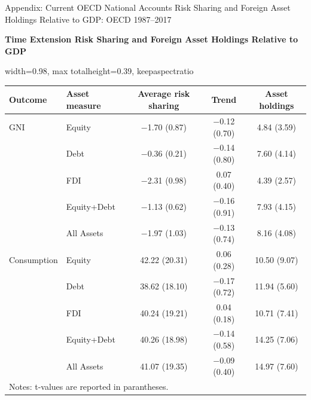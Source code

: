 \documentclass[aspectratio=169, 10pt]{beamer}
\begin{document}
\begin{frame}[label=appendix:oecd2005_assets]{Appendix: Current OECD National Accounts Risk Sharing and Foreign Asset Holdings Relative to GDP: OECD 1987--2017}
  \centering
  
  \begingroup
  \tiny
  \setlength{\tabcolsep}{2pt}
  \renewcommand{\arraystretch}{0.62}
  
  \vspace{0.03cm}
  
  {\scriptsize \textbf{Time Extension Risk Sharing and Foreign Asset Holdings Relative to GDP}}
  
  \vspace{0.04cm}
  
  \begin{adjustbox}{
    width=0.98\textwidth,
    max totalheight=0.39\textheight,
    keepaspectratio
  }
  \begin{tabular}{llccc}
  \hline\hline
  Outcome & Asset measure & Average risk sharing & Trend & Asset holdings \\
  \hline
  GNI         & Equity       & $-$1.70 (0.87) & $-$0.12 (0.70) & 4.84 (3.59)  \\
  & Debt         & $-$0.36 (0.21) & $-$0.14 (0.80) & 7.60 (4.14)  \\
  & FDI          & $-$2.31 (0.98) & 0.07 (0.40)    & 4.39 (2.57)  \\
  & Equity+Debt  & $-$1.13 (0.62) & $-$0.16 (0.91) & 7.93 (4.15)  \\
  & All Assets   & $-$1.97 (1.03) & $-$0.13 (0.74) & 8.16 (4.08)  \\
  \hline
  Consumption & Equity       & 42.22 (20.31)  & 0.06 (0.28)    & 10.50 (9.07) \\
  & Debt         & 38.62 (18.10)  & $-$0.17 (0.72) & 11.94 (5.60) \\
  & FDI          & 40.24 (19.21)  & 0.04 (0.18)    & 10.71 (7.41) \\
  & Equity+Debt  & 40.26 (18.98)  & $-$0.14 (0.58) & 14.25 (7.06) \\
  & All Assets   & 41.07 (19.35)  & $-$0.09 (0.40) & 14.97 (7.60) \\
  \hline\hline
  \multicolumn{5}{l}{\footnotesize Notes: t-values are reported in parantheses.} \\
  \end{tabular}
  \end{adjustbox}
  
  \vspace{0.10cm}
  

\end{frame}
\end{document}
